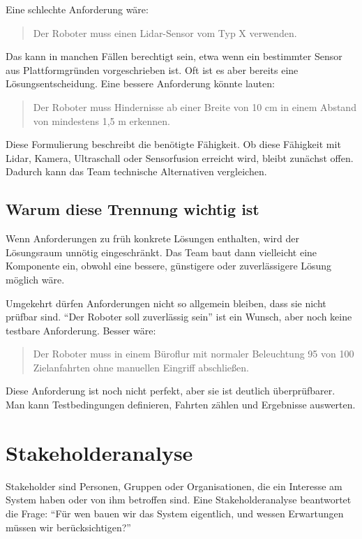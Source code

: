 Eine schlechte Anforderung wäre:

\begin{quote}
Der Roboter muss einen Lidar-Sensor vom Typ X verwenden.
\end{quote}

Das kann in manchen Fällen berechtigt sein, etwa wenn ein bestimmter Sensor aus Plattformgründen vorgeschrieben ist. Oft ist es aber bereits eine Lösungsentscheidung. Eine bessere Anforderung könnte lauten:

\begin{quote}
Der Roboter muss Hindernisse ab einer Breite von 10 cm in einem Abstand von mindestens 1,5 m erkennen.
\end{quote}

Diese Formulierung beschreibt die benötigte Fähigkeit. Ob diese Fähigkeit mit Lidar, Kamera, Ultraschall oder Sensorfusion erreicht wird, bleibt zunächst offen. Dadurch kann das Team technische Alternativen vergleichen.

\subsection{Warum diese Trennung wichtig ist}
Wenn Anforderungen zu früh konkrete Lösungen enthalten, wird der Lösungsraum unnötig eingeschränkt. Das Team baut dann vielleicht eine Komponente ein, obwohl eine bessere, günstigere oder zuverlässigere Lösung möglich wäre.

Umgekehrt dürfen Anforderungen nicht so allgemein bleiben, dass sie nicht prüfbar sind. \enquote{Der Roboter soll zuverlässig sein} ist ein Wunsch, aber noch keine testbare Anforderung. Besser wäre:

\begin{quote}
Der Roboter muss in einem Büroflur mit normaler Beleuchtung 95 von 100 Zielanfahrten ohne manuellen Eingriff abschließen.
\end{quote}

Diese Anforderung ist noch nicht perfekt, aber sie ist deutlich überprüfbarer. Man kann Testbedingungen definieren, Fahrten zählen und Ergebnisse auswerten.

\section{Stakeholderanalyse}
Stakeholder sind Personen, Gruppen oder Organisationen, die ein Interesse am System haben oder von ihm betroffen sind. Eine Stakeholderanalyse beantwortet die Frage: \enquote{Für wen bauen wir das System eigentlich, und wessen Erwartungen müssen wir berücksichtigen?}

